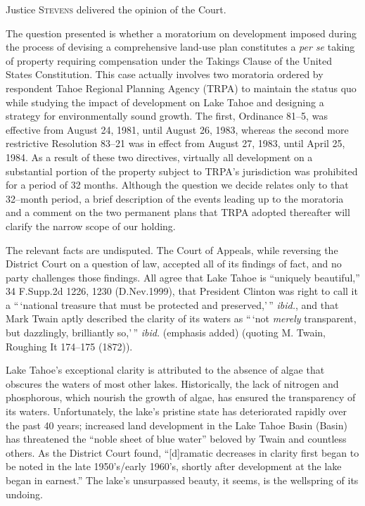

\opinion Justice \textsc{Stevens} delivered the opinion of the Court.

The question presented is whether a moratorium on development imposed during the
process of devising a comprehensive land-use plan constitutes a \textit{per se}
taking of property requiring compensation under the Takings Clause of the United
States Constitution. This case actually involves two moratoria ordered by
respondent Tahoe Regional Planning Agency (TRPA) to maintain the status quo
while studying the impact of development on Lake Tahoe and designing a strategy
for environmentally sound growth. The first, Ordinance 81--5, was effective from
August 24, 1981, until August 26, 1983, whereas the second more restrictive
Resolution 83--21 was in effect from August 27, 1983, until April 25, 1984. As a
result of these two directives, virtually all development on a substantial
portion of the property subject to TRPA's jurisdiction was prohibited for a
period of 32 months. Although the question we decide relates only to that
32--month period, a brief description of the events leading up to the moratoria
and a comment on the two permanent plans that TRPA adopted thereafter will
clarify the narrow scope of our holding.



The relevant facts are undisputed. The Court of Appeals, while reversing the
District Court on a question of law, accepted all of its findings of fact, and
no party challenges those findings. All agree that Lake Tahoe is ``uniquely
beautiful,'' 34 F.Supp.2d 1226, 1230 (D.Nev.1999), that President Clinton was
right to call it a ``\,`national treasure that must be protected and
preserved,'\,'' \textit{ibid.}, and that Mark Twain aptly described the clarity
of its waters as ``\,`not \textit{merely} transparent, but dazzlingly,
brilliantly so,'\,'' \textit{ibid.} (emphasis added) (quoting M. Twain, Roughing
It 174--175 (1872)).

Lake Tahoe's exceptional clarity is attributed to the absence of algae that
obscures the waters of most other lakes. Historically, the lack of nitrogen and
phosphorous, which nourish the growth of algae, has ensured the transparency of
its waters. Unfortunately, the lake's pristine state has deteriorated rapidly
over the past 40 years; increased land development in the Lake Tahoe Basin
(Basin) has threatened the ``noble sheet of blue water'' beloved by Twain
and countless others. As the District Court found, ``[d]ramatic decreases in
clarity first began to be noted in the late 1950's/early 1960's, shortly after
development at the lake began in earnest.'' The lake's unsurpassed beauty, it
seems, is the wellspring of its undoing.

